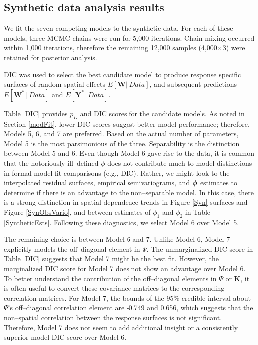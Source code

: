 \documentclass[a4paper]{article}
\newcommand{\bphi}{ \mbox{\boldmath $\phi$}}
\newcommand{\bK}{\textbf{K}}
\newcommand{\bW}{\textbf{W}}
\newcommand{\bY}{\textbf{Y}}
\begin{document}
\subsection{Synthetic data analysis results}
We fit the seven competing models to the synthetic data. For each of
these models, three MCMC chains were run for 5,000
iterations.  Chain mixing occurred within 1,000 iterations, therefore the remaining 12,000 samples
(4,000$\times$3) were retained for posterior analysis.

DIC was used to select the best candidate model to produce response
specific surfaces of random spatial effects $E[\bW |\; Data]$, and subsequent
predictions $E[\bW^{\ast}\,|\, Data]$ and $E[\bY^{\ast}|\; Data]$.

Table \ref{DIC} provides $p_{D}$ and DIC scores for the candidate models.
As noted in Section \ref{modFit}, lower DIC scores suggest better
model performance; therefore, Models 5, 6, and 7 are preferred. Based on the actual number of parameters, Model 5 is
the most parsimonious of the three.  Separability is the distinction
between Model 5 and 6.  Even though Model 6 gave rise to the data,
it is common that the notoriously ill--defined $\phi$ does not
contribute much to model distinctions in formal model fit
comparisons (e.g., DIC).  Rather, we might look to the interpolated
residual surfaces, empirical semivariograms, and $\bphi$ estimates
to determine if there is an advantage to the non--separable model.
In this case, there is a strong distinction in spatial dependence
trends in Figure \ref{Syn} surfaces and Figure \ref{SynObsVario}, and
between estimates of $\phi_1$ and $\phi_2$ in Table
\ref{SyntheticEsts}.  Following these diagnostics, we select Model 6
over Model 5.  

The remaining choice is between Model 6 and 7.  Unlike Model 6, Model 7 explicitly models the off--diagonal element in $\Psi$.  The unmarginalized DIC score in Table \ref{DIC} suggests that Model 7 might be the best fit. However, the marginalized DIC score for Model 7 does not show an advantage over Model 6.  To better understand the contribution of the off--diagonal elements in $\Psi$ or $\bK$, it is often useful to convert these covariance matrices to the corresponding correlation matrices.  For Model 7, the bounds of the 95\% credible interval about $\Psi$'s off--diagonal correlation element are -0.749 and 0.656, which suggests that the non--spatial correlation between the response surfaces is not significant.  Therefore, Model 7 does not seem to add additional insight or a consistently superior model DIC score over Model 6.
\end{document}
